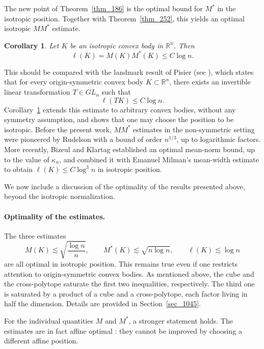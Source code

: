 \documentclass[12pt]{article}
\newtheorem{corollary}[theorem]{Corollary}
\theoremstyle{definition}
\theoremstyle{remark}
\newcommand{\R}{\mathbb R}
\begin{document}
The new point of Theorem~\ref{thm_186} is the
optimal bound for $M^*$ in the isotropic position. Together with
Theorem~\ref{thm_252}, this yields an optimal isotropic $MM^*$ estimate.

\begin{corollary}\label{cor_265}
Let $K$ be an isotropic convex body in $\R^n$. Then
\begin{equation}\label{eq_267}
  \ell(K)=M(K)M^*(K)\leq C\log n.
\end{equation}
\end{corollary}

This should be compared with the landmark result of Pisier (see \cite{Pisier}), which
states that for every origin-symmetric convex body $K\subset\R^n$,
there exists an invertible linear transformation $T\in GL_n$ such
that
\begin{equation}\label{eq_276}
  \ell(TK)\leq C\log n.
\end{equation}
Corollary~\ref{cor_265} extends this estimate to
arbitrary convex bodies, without any symmetry assumption, and shows
that one may choose the position to be isotropic.
Before the present work, $MM^*$ estimates in the non-symmetric setting were pioneered by Rudelson \cite{Rudelson} with a bound of order $n^{1/3}$, up to logarithmic factors. More recently,
Bizeul and Klartag established an optimal mean-norm bound, up to the value of $\kappa_n$, and combined it with Emanuel Milman's mean-width estimate to obtain $\ell(K) \leq C\log^3 n$
in isotropic position.

We now include a
discussion of the optimality of the results presented above, beyond the isotropic
normalization.

\paragraph{Optimality of the estimates.}

The three estimates
\[
  M(K)\lesssim\sqrt{\frac{\log n}{n}},
  \qquad
  M^*(K)\lesssim\sqrt{n\log n},
  \qquad
  \ell(K)\lesssim\log n
\]
are all optimal in isotropic position. This remains true even if one
restricts attention to origin-symmetric convex bodies. As mentioned
above, the cube and the cross-polytope saturate the first two
inequalities, respectively. The third one is saturated by a product of
a cube and a cross-polytope, each factor living in half the dimension.
Details are provided in Section~\ref{sec_1045}.

For the individual quantities $M$ and $M^*$, a stronger statement holds. The estimates are in fact affine optimal : they cannot be
improved by choosing a different affine position.
\end{document}
